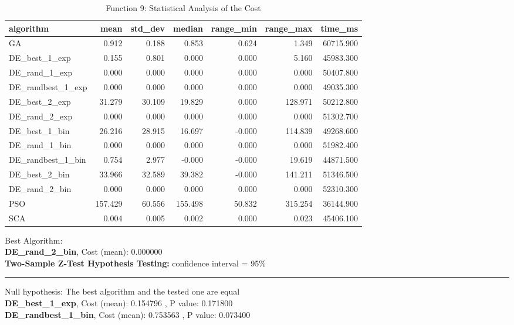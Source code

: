 \documentclass[12pt]{article}
\begin{document}
\begin{table}[H]
    \centering
    \footnotesize
\begin{tabular}{lrrrrrr}
\toprule
         algorithm &    mean &  std\_dev &  median &  range\_min &  range\_max &   time\_ms \\
\midrule
                GA &   0.912 &    0.188 &   0.853 &      0.624 &      1.349 & 60715.900 \\
     DE\_best\_1\_exp &   0.155 &    0.801 &   0.000 &      0.000 &      5.160 & 45983.300 \\
     DE\_rand\_1\_exp &   0.000 &    0.000 &   0.000 &      0.000 &      0.000 & 50407.800 \\
 DE\_randbest\_1\_exp &   0.000 &    0.000 &   0.000 &      0.000 &      0.000 & 49035.300 \\
     DE\_best\_2\_exp &  31.279 &   30.109 &  19.829 &      0.000 &    128.971 & 50212.800 \\
     DE\_rand\_2\_exp &   0.000 &    0.000 &   0.000 &      0.000 &      0.000 & 51302.700 \\
     DE\_best\_1\_bin &  26.216 &   28.915 &  16.697 &     -0.000 &    114.839 & 49268.600 \\
     DE\_rand\_1\_bin &   0.000 &    0.000 &   0.000 &      0.000 &      0.000 & 51982.400 \\
 DE\_randbest\_1\_bin &   0.754 &    2.977 &  -0.000 &     -0.000 &     19.619 & 44871.500 \\
     DE\_best\_2\_bin &  33.966 &   32.589 &  39.382 &     -0.000 &    141.211 & 51346.500 \\
     DE\_rand\_2\_bin &   0.000 &    0.000 &   0.000 &      0.000 &      0.000 & 52310.300 \\
               PSO & 157.429 &   60.556 & 155.498 &     50.832 &    315.254 & 36144.900 \\
               SCA &   0.004 &    0.005 &   0.002 &      0.000 &      0.023 & 45406.100 \\
\bottomrule
\end{tabular}

\caption{Function 9: Statistical Analysis of the Cost} 
    \end{table}
Best Algorithm: \\
\textbf{DE\_rand\_2\_bin}, Cost (mean): 0.000000\\
\noindent
\textbf{Two-Sample Z-Test Hypothesis Testing: }
confidence interval = 95\%\\
\vspace{-3mm}
\rule[3mm]{\linewidth}{0.2pt}
Null hypothesis: The best algorithm and the tested one are equal\\
\textbf{DE\_best\_1\_exp}, Cost (mean): 0.154796
, P value: 0.171800\\
\textbf{DE\_randbest\_1\_bin}, Cost (mean): 0.753563
, P value: 0.073400\\
\newpage
\end{document}
